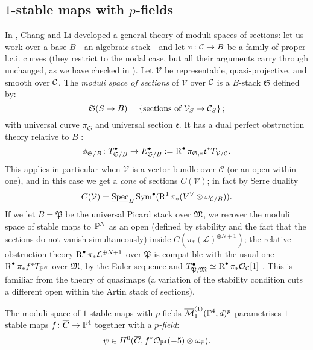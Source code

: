 \subsection{$1$-stable maps with $p$-fields}\label{subsec:p-fields} In \cite{CL-pfields}, Chang and Li developed a general theory of moduli spaces of sections: let us work over a base $B$ - an algebraic stack - and let $\pi\colon \mathcal{C}\rightarrow B$ be a family of proper l.c.i. curves (they restrict to the nodal case, but all their arguments carry through unchanged, as we have checked in \cite[\S 3]{BCM}). Let $\mathcal V$ be representable, quasi-projective, and smooth over $\mathcal{C}$. The \emph{moduli space of sections} of $\mathcal V$ over $\mathcal{C}$ is a $B$-stack $\mathfrak S$ defined by:
 \[\mathfrak{S}(S\rightarrow B)=\left\{\text{sections of}\ \mathcal V_S\rightarrow\mathcal{C}_S\right\};\]
with universal curve $\pi_{\mathfrak S}$ and universal section $\mathfrak e$. It has a dual perfect obstruction theory relative to $B$ \cite[Proposition 2.5]{CL-pfields}:
\[ \phi_{\mathfrak S/B}\colon T^{\bullet}_{\mathfrak S/B}\rightarrow E^{\bullet}_{\mathfrak S/B}:=\operatorname{R}^{\bullet}\pi_{\mathfrak S,*}\mathfrak e^* T_{\mathcal V/\mathcal{C}}.\]
This applies in particular when $\mathcal V$ is a vector bundle over $\mathcal C$ (or an open within one), and in this case we get a \emph{cone} of sections $C(\mathcal V)$; in fact by Serre duality \[C(\mathcal V)=\underline{\operatorname{Spec}}_B\operatorname{Sym}^\bullet(\operatorname{R}^1\pi_* (V^\vee\otimes \omega_{\mathcal C/B})).\] If we let $B=\mathfrak{P}$ be the universal Picard stack over $\mathfrak M$, we recover the moduli space of stable maps to $\mathbb P^N$ as an open (defined by stability and the fact that the sections do not vanish simultaneously) inside $C(\pi_*(\mathcal L)^{\oplus N+1})$; the relative obstruction theory $\operatorname{R}^{\bullet}\pi_*\mathcal L^{\oplus N+1}$ over $\mathfrak{P}$ is compatible with the usual one $\operatorname{R}^{\bullet}\pi_*f^*T_{\mathbb P^N}$  over $\mathfrak M$, by the Euler sequence and $T^{\bullet}_{\mathfrak P/\mathfrak M}\simeq\operatorname{R}^{\bullet}\pi_*\mathcal{O}_{\mathcal C}[1]$ \cite[Lemma 2.8]{CL-pfields}. This is familiar from the theory of quasimaps (a variation of the stability condition cuts a different open within the Artin stack of sections).
\begin{dfn}
 The moduli space of $1$-stable maps with $p$-fields $\overline{\mathcal{M}}_1^{(1)}(\mathbb P^4,d)^p$ parametrises $1$-stable maps $\bar{f}\colon\overline{C}\rightarrow\mathbb P^4$ together with a \emph{$p$-field}: \[\psi \in  H^0(\overline{C},\bar{f}^*\mathcal{O}_{\mathbb P^4}(-5)\otimes\omega_{\bar{\pi}}).\]
\end{dfn}
